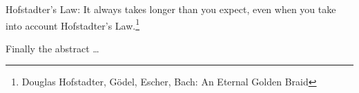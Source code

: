 
Hofstadter's Law: It always takes longer than you expect, even when you take into account Hofstadter's Law.\footnote{
	Douglas Hofstadter, Gödel, Escher, Bach: An Eternal Golden Braid}


Finally the abstract \ldots